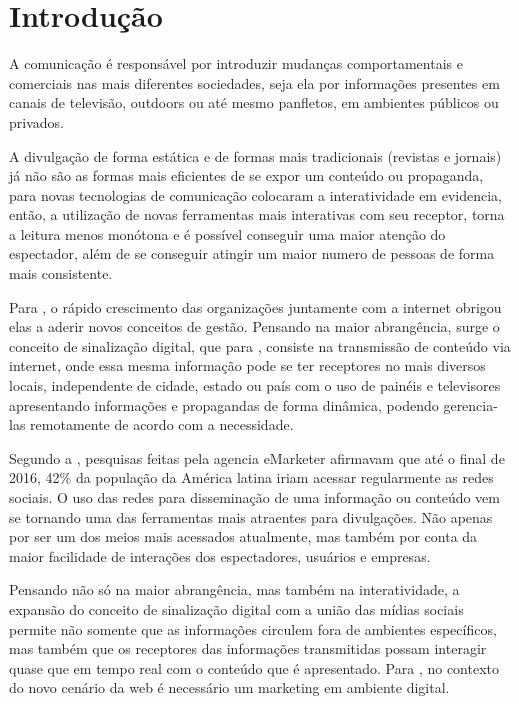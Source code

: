 \documentclass[
	12pt,				%
	openright,			%
	oneside,			%
	a4paper,			%
	english,			%
	french,				%
	spanish,			%
	brazil,				%
	]{abntex2}
\begin{document}
\frenchspacing 
\imprimircapa
\imprimirfolhaderosto*



\section*{Introdução}
	A comunicação é responsável por introduzir mudanças comportamentais e comerciais nas mais diferentes sociedades, seja ela por informações presentes em canais de televisão, outdoors ou até mesmo panfletos, em ambientes públicos ou privados.
	
	A divulgação de forma estática e de formas mais tradicionais (revistas e jornais) já não são as formas mais eficientes de se expor um conteúdo ou propaganda, para \cite{escobar2007} novas tecnologias de comunicação colocaram a interatividade em evidencia, então,  a utilização de novas ferramentas mais interativas com seu receptor, torna a leitura menos monótona e é possível conseguir uma maior atenção do espectador, além de se conseguir atingir um maior numero de pessoas de forma mais consistente.
	
	Para \cite{machado2010}, o rápido crescimento das organizações juntamente com a internet obrigou elas a aderir novos conceitos de gestão. Pensando na maior abrangência, surge o conceito de sinalização digital, que para \cite{machado2010}, consiste na transmissão de conteúdo via internet,  onde essa mesma informação pode se ter receptores no mais diversos locais, independente de cidade, estado ou país com o uso de painéis e televisores apresentando informações e propagandas de forma dinâmica, podendo gerencia-las remotamente de acordo com a necessidade.
	
	Segundo a \cite{forbes2016}, pesquisas feitas pela agencia eMarketer afirmavam que até o final de 2016, 42\% da população da América latina iriam acessar regularmente as redes sociais. O uso das redes para disseminação de uma informação ou conteúdo vem se tornando uma das ferramentas mais atraentes para divulgações. Não apenas por ser um dos meios mais acessados atualmente, mas também por conta da maior facilidade de interações dos espectadores, usuários e empresas.
	
	Pensando não só na maior abrangência, mas também na interatividade, a expansão do conceito de sinalização digital com a união das mídias sociais permite não somente que as informações circulem fora de ambientes específicos, mas também que os receptores das informações transmitidas possam interagir quase que em tempo real com o conteúdo que é apresentado. Para \cite{santos2014}, no contexto do novo cenário da web é necessário um marketing em ambiente digital. 
	
\end{document}

